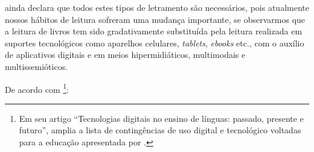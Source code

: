\documentclass{textolivre}
\begin{document}
\textcite{rojo_pedagogia_2016} ainda declara que todos estes tipos de letramento são necessários, pois atualmente nossos hábitos de leitura sofreram uma mudança importante, se observarmos que a leitura de livros tem sido gradativamente substituída pela leitura realizada em suportes tecnológicos como aparelhos celulares, \textit{tablets}, \textit{ebooks} etc., com o auxílio de aplicativos digitais e em meios hipermidiáticos, multimodais e multissemióticos.

De acordo com \textcite{menezes_tecnologias_2019}\footnote{Em seu artigo “Tecnologias digitais no ensino de línguas: passado, presente e futuro”, \textcite{menezes_tecnologias_2019} amplia a lista de contingências de uso digital e tecnológico voltadas para a educação apresentada por \cite[p. 197]{gee_anti-education_2013}.}:
\end{document}
